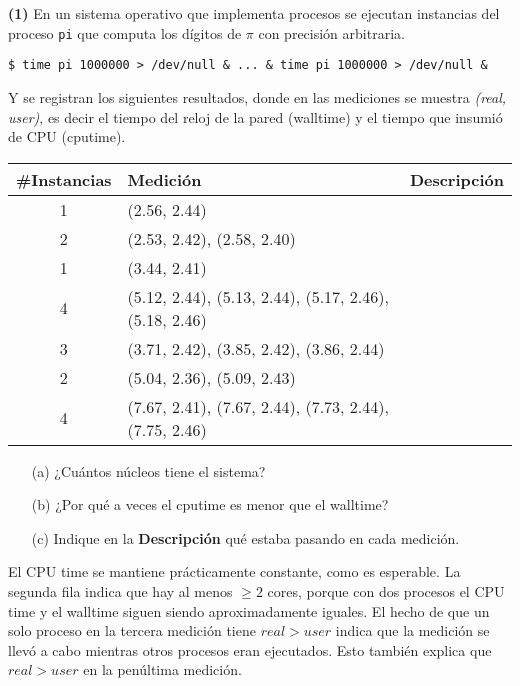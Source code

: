 \documentclass[12pt]{article}
\theoremstyle{definition}
\begin{document}
\begin{shaded}
    
\textbf{(1)} En un sistema operativo que implementa procesos se ejecutan instancias del proceso \texttt{pi} que computa los dígitos de $\pi$ con precisión arbitraria.

\begin{verbatim}
$ time pi 1000000 > /dev/null & ... & time pi 1000000 > /dev/null &
\end{verbatim}

Y se registran los siguientes resultados, donde en las mediciones se muestra \textit{(real, user)}, es decir el tiempo del reloj de la pared (walltime) y el tiempo que insumió de CPU (cputime).

\begin{center}
\begin{tabular}{|c|>{\raggedright}m{9cm}|c|}
\hline
\#Instancias & Medición & Descripción \\
\hline
1 & (2.56, 2.44) & \\
\hline
2 & (2.53, 2.42),  (2.58, 2.40) & \\
\hline
1 & (3.44, 2.41) & \\
\hline
4 & (5.12, 2.44),  (5.13, 2.44),  (5.17, 2.46),  (5.18, 2.46) & \\
\hline
3 & (3.71, 2.42),  (3.85, 2.42),  (3.86, 2.44) & \\
\hline
2 & (5.04, 2.36),  (5.09, 2.43) & \\
\hline
4 & (7.67, 2.41),  (7.67, 2.44),  (7.73, 2.44),  (7.75, 2.46) & \\
\hline
\end{tabular}
\end{center}

\begin{enumerate}
    \item[(a)] ¿Cuántos núcleos tiene el sistema?
    \item[(b)] ¿Por qué a veces el cputime es menor que el walltime?
    \item[(c)] Indique en la \textbf{Descripción} qué estaba pasando en cada medición.
\end{enumerate}



\end{shaded}


El CPU time se mantiene prácticamente constante, como es esperable. La segunda
fila indica que hay al menos $\geq 2$ cores, porque con dos procesos el CPU time
y el walltime siguen siendo aproximadamente iguales. El hecho de que un solo
proceso en la tercera medición tiene $real > user$ indica que la medición se
llevó a cabo mientras otros procesos eran ejecutados. Esto también explica que
$real > user$ en la penúltima medición.
\end{document}
